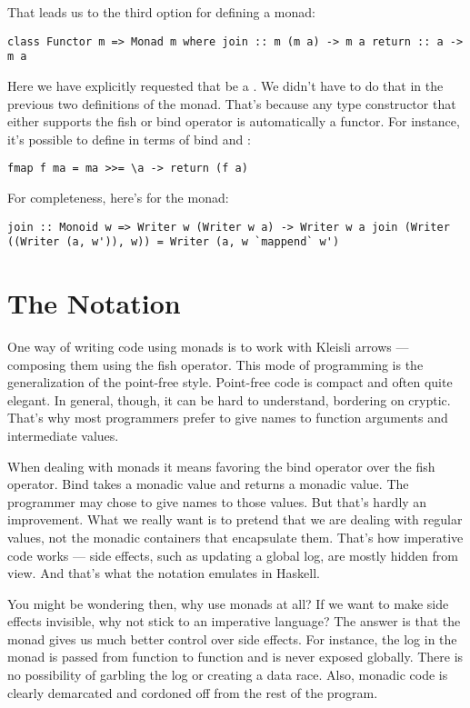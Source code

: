 That leads us to the third option for defining a monad:

\begin{verbatim}
class Functor m => Monad m where join :: m (m a) -> m a return :: a -> m a
\end{verbatim}

Here we have explicitly requested that  be a .
We didn't have to do that in the previous two definitions of the monad.
That's because any type constructor  that either supports the
fish or bind operator is automatically a functor. For instance, it's
possible to define  in terms of bind and :

\begin{verbatim}
fmap f ma = ma >>= \a -> return (f a)
\end{verbatim}

For completeness, here's  for the  monad:

\begin{verbatim}
join :: Monoid w => Writer w (Writer w a) -> Writer w a join (Writer ((Writer (a, w')), w)) = Writer (a, w `mappend` w')
\end{verbatim}

\section{\texorpdfstring{The 
Notation}{The do Notation}}\label{the-do-notation}

One way of writing code using monads is to work with Kleisli arrows ---
composing them using the fish operator. This mode of programming is the
generalization of the point-free style. Point-free code is compact and
often quite elegant. In general, though, it can be hard to understand,
bordering on cryptic. That's why most programmers prefer to give names
to function arguments and intermediate values.

When dealing with monads it means favoring the bind operator over the
fish operator. Bind takes a monadic value and returns a monadic value.
The programmer may chose to give names to those values. But that's
hardly an improvement. What we really want is to pretend that we are
dealing with regular values, not the monadic containers that encapsulate
them. That's how imperative code works --- side effects, such as
updating a global log, are mostly hidden from view. And that's what the
 notation emulates in Haskell.

You might be wondering then, why use monads at all? If we want to make
side effects invisible, why not stick to an imperative language? The
answer is that the monad gives us much better control over side effects.
For instance, the log in the  monad is passed from
function to function and is never exposed globally. There is no
possibility of garbling the log or creating a data race. Also, monadic
code is clearly demarcated and cordoned off from the rest of the
program.

